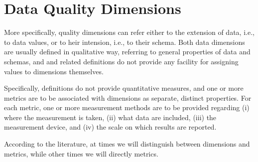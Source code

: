 \chapter{Data Quality Dimensions}

\ifpdf
    \graphicspath{{Chapter2/Figs/Raster/}{Chapter2/Figs/PDF/}{Chapter2/Figs/}}
\else
    \graphicspath{{Chapter2/Figs/Vector/}{Chapter2/Figs/}}
\fi


More specifically, quality dimensions can refer either to the extension of data, i.e., to data values, or to heir 
intension, i.e., to their schema. Both data dimensions are usually defined in qualitative way, referring to general properties of data and schemas,
and and related definitions do not provide any facility for assigning values to dimensions themselves. 

Specifically, definitions do not provide quantitative measures, and one or more metrics are to be associated with dimensions as separate, distinct 
properties. For each metric, one or more measurement methods are to be provided regarding (i) where the measurement is taken, (ii) what data are included, 
(iii) the measurement device, and (iv) the scale on which results are reported.

According to the literature, at times we will distinguish between dimensions and metrics, while other times we will directly metrics.

